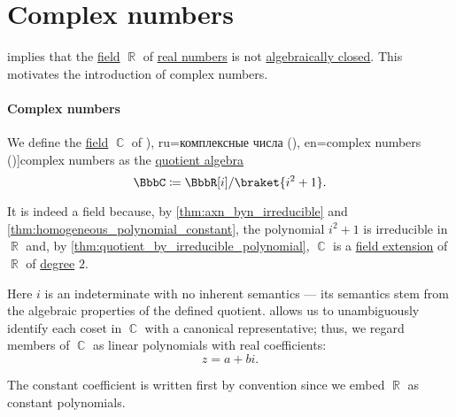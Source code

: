 \section{Complex numbers}\label{sec:complex_numbers}

 implies that the \hyperref[def:field]{field} \( \BbbR \) of \hyperref[def:real_numbers]{real numbers} is not \hyperref[def:algebraically_closed_field]{algebraically closed}. This motivates the introduction of complex numbers.

\paragraph{Complex numbers}

\begin{definition}\label{def:complex_numbers}\mimprovised
  We define the \hyperref[def:field]{field} \( \BbbC \) of \term[bg=комплексни числа (\cite[296]{ИлинСадовничиСендов1984АнализТом1}), ru=комплексные числа (\cite[12]{Маркушевич1967АналитическиеФункцииТом1}), en=complex numbers (\cite[1]{Ahlfors1979ComplexAnalysis})]{complex numbers} as the \hyperref[def:algebra_over_ring/quotient]{quotient algebra}
  \begin{equation}\label{eq:def:complex_numbers/quotient}
    \BbbC \coloneqq \BbbR[i] / \braket{ i^2 + 1 }.
  \end{equation}

  It is indeed a field because, by \cref{thm:axn_byn_irreducible} and \cref{thm:homogeneous_polynomial_constant}, the polynomial \( i^2 + 1 \) is irreducible in \( \BbbR \) and, by \cref{thm:quotient_by_irreducible_polynomial}, \( \BbbC \) is a \hyperref[def:field/submodel]{field extension} of \( \BbbR \) of \hyperref[def:field_extension_degree]{degree} \( 2 \).

  Here \( i \) is an indeterminate with no inherent semantics --- its semantics stem from the algebraic properties of the defined quotient.  allows us to unambiguously identify each coset in \( \BbbC \) with a canonical representative; thus, we regard members of \( \BbbC \) as linear polynomials with real coefficients:
  \begin{equation}\label{eq:def:complex_numbers/number}
    z = a + bi.
  \end{equation}

  The constant coefficient is written first by convention since we embed \( \BbbR \) as constant polynomials.


\end{definition}

